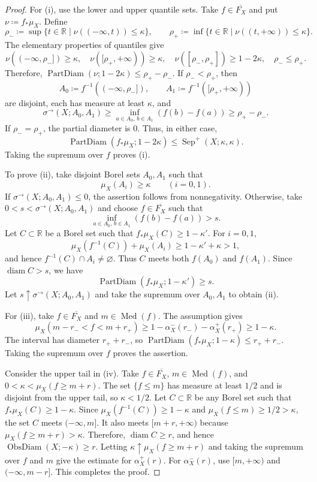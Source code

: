 \documentclass{amsart}
\theoremstyle{plain}
\theoremstyle{definition}
\theoremstyle{remark}
\newcommand{\R}{\mathbb{R}}
\DeclareMathOperator{\pd}{PartDiam}
\DeclareMathOperator{\od}{ObsDiam}
\begin{document}
\begin{proof}
For \textup{(i)}, use the lower and upper quantile sets.  Take
$f\in\overline{F_X}$ and put $\nu\coloneqq f_*\mu_X$.  Define
\[
\rho_-\coloneqq\sup\{t\in\R\mid\nu((-\infty,t))\leq\kappa\},\qquad
\rho_+\coloneqq\inf\{t\in\R\mid\nu((t,+\infty))\leq\kappa\}.
\]
The elementary properties of quantiles give
\[
\nu((-\infty,\rho_-])\geq\kappa,\quad
\nu([\rho_+,+\infty))\geq\kappa,\quad
\nu([\rho_-,\rho_+])\geq1-2\kappa,\quad
\rho_-\leq\rho_+.
\]
Therefore,
$\pd(\nu;1-2\kappa)\leq\rho_+-\rho_-$.  If
$\rho_-<\rho_+$, then
\[
A_0\coloneqq f^{-1}((-\infty,\rho_-]),\qquad
A_1\coloneqq f^{-1}([\rho_+,+\infty))
\]
are disjoint, each has measure at least $\kappa$, and
\[
\sigma^\to(X;A_0,A_1)
\geq\inf_{a\in A_0,\,b\in A_1}(f(b)-f(a))
\geq\rho_+-\rho_-.
\]
If $\rho_-=\rho_+$, the partial diameter is $0$.  Thus, in either case,
\[
\pd(f_*\mu_X;1-2\kappa)
\leq\operatorname{Sep}^+(X;\kappa,\kappa).
\]
Taking the supremum over $f$ proves \textup{(i)}.

To prove \textup{(ii)}, take disjoint Borel sets $A_0,A_1$ such that
\[
\mu_X(A_i)\geq\kappa\qquad(i=0,1).
\]
If
$\sigma^\to(X;A_0,A_1)\leq0$, the assertion follows from nonnegativity.
Otherwise, take $0<s<\sigma^\to(X;A_0,A_1)$ and choose
$f\in\overline{F_X}$ such that
\[
\inf_{a\in A_0,\,b\in A_1}(f(b)-f(a))>s.
\]
Let $C\subset\R$ be a Borel set such that
$f_*\mu_X(C)\geq1-\kappa'$.  For $i=0,1$,
\[
\mu_X(f^{-1}(C))+\mu_X(A_i)\geq1-\kappa'+\kappa>1,
\]
and hence $f^{-1}(C)\cap A_i\neq\varnothing$.  Thus $C$ meets both
$f(A_0)$ and $f(A_1)$.  Since $\operatorname{diam}C>s$, we have
\[
\pd(f_*\mu_X;1-\kappa')\geq s.
\]
Let $s\uparrow\sigma^\to(X;A_0,A_1)$ and take the supremum over
$A_0,A_1$ to obtain \textup{(ii)}.

For \textup{(iii)}, take $f\in\overline{F_X}$ and
$m\in\operatorname{Med}(f)$.  The assumption gives
\[
\mu_X(m-r_-<f<m+r_+)
\geq1-\alpha_X^-(r_-)-\alpha_X^+(r_+)\geq1-\kappa.
\]
The interval has diameter $r_++r_-$, so
$\pd(f_*\mu_X;1-\kappa)\leq r_++r_-$.  Taking the supremum over $f$ proves
the assertion.

Consider the upper tail in \textup{(iv)}.  Take
$f\in\overline{F_X}$, $m\in\operatorname{Med}(f)$, and
$0<\kappa<\mu_X(f\geq m+r)$.  The set $\{f\leq m\}$ has measure at least
$1/2$ and is disjoint from the upper tail, so $\kappa<1/2$.  Let
$C\subset\R$ be any Borel set such that
$f_*\mu_X(C)\geq1-\kappa$.  Since
$\mu_X(f^{-1}(C))\geq1-\kappa$ and
$\mu_X(f\leq m)\geq1/2>\kappa$, the set $C$ meets
$(-\infty,m]$.  It also meets $[m+r,+\infty)$ because
$\mu_X(f\geq m+r)>\kappa$.  Therefore,
$\operatorname{diam}C\geq r$, and hence $\od(X;-\kappa)\geq r$.  Letting
$\kappa\uparrow\mu_X(f\geq m+r)$ and taking the supremum over $f$ and $m$
give the estimate for $\alpha_X^+(r)$.  For $\alpha_X^-(r)$, use
$[m,+\infty)$ and $(-\infty,m-r]$.  This completes the proof.
\end{proof}
\end{document}
